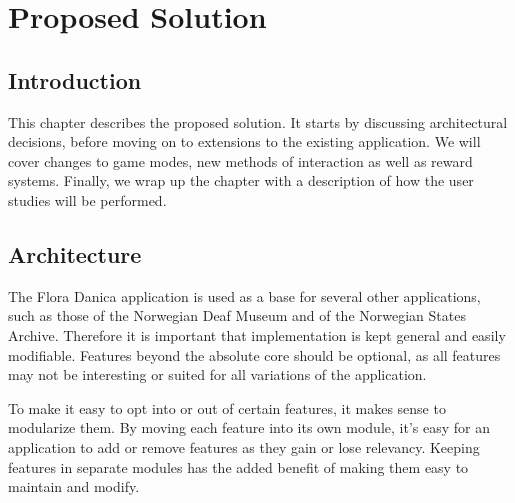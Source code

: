 
\chapter{Proposed Solution}

\label{Chapter3}



\section{Introduction}

This chapter describes the proposed solution. It starts by discussing architectural decisions, before moving on to extensions to the existing application. We will cover changes to game modes, new methods of interaction as well as reward systems. Finally, we wrap up the chapter with a description of how the user studies will be performed.


\section{Architecture}

The Flora Danica application is used as a base for several other applications, such as those of the Norwegian Deaf Museum and of the Norwegian States Archive. Therefore it is important that implementation is kept general and easily modifiable. Features beyond the absolute core should be optional, as all features may not be interesting or suited for all variations of the application.

To make it easy to opt into or out of certain features, it makes sense to modularize them. By moving each feature into its own module, it's easy for an application to add or remove features as they gain or lose relevancy. Keeping features in separate modules has the added benefit of making them easy to maintain and modify.



